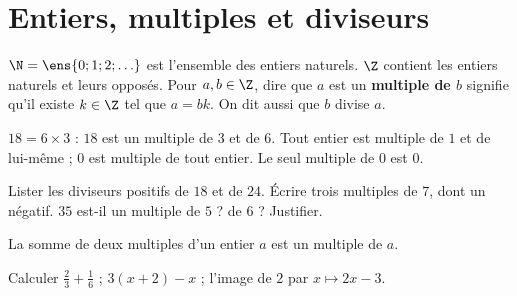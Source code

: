 \section{Entiers, multiples et diviseurs}
\begin{keypoint}[Définitions]
$\N=\ens{0;1;2;\ldots}$ est l'ensemble des entiers naturels. $\Z$ contient les entiers naturels et leurs opposés.
Pour $a,b\in\Z$, dire que $a$ est un \textbf{multiple de $b$} signifie qu'il existe $k\in\Z$ tel que $a=bk$. On dit aussi que $b$ divise $a$.
\end{keypoint}
$18=6\times3$ : $18$ est un multiple de $3$ et de $6$. Tout entier est multiple de $1$ et de lui-même ; $0$ est multiple de tout entier. Le seul multiple de $0$ est $0$.
\begin{example}Lister les diviseurs positifs de $18$ et de $24$. Écrire trois multiples de $7$, dont un négatif. $35$ est-il un multiple de $5$ ? de $6$ ? Justifier.\end{example}
\begin{keypoint}
La somme de deux multiples d'un entier $a$ est un multiple de $a$.
\end{keypoint}
\begin{fluency}[5--10 min]Calculer $\frac23+\frac16$ ; $3(x+2)-x$ ; l'image de $2$ par $x\mapsto 2x-3$.\end{fluency}

